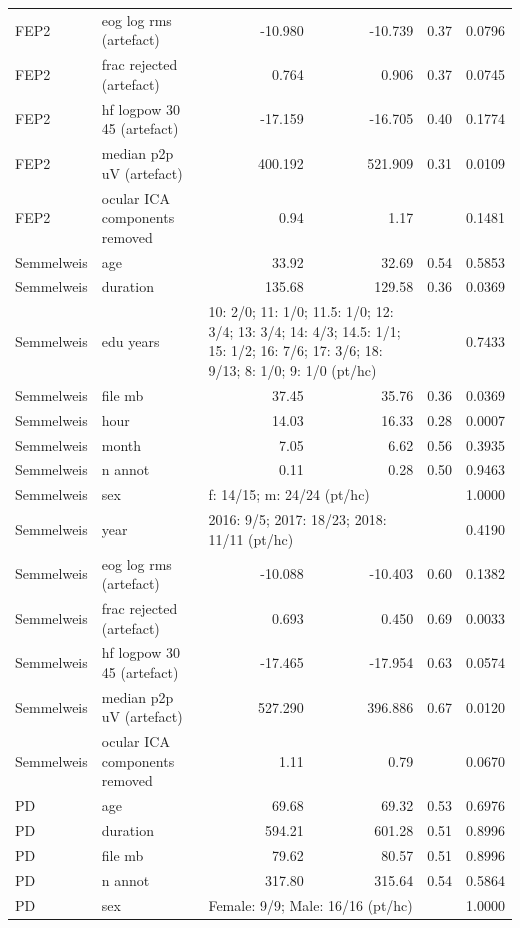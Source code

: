 \documentclass[10pt]{article}
\begin{document}
\begin{longtable}{l l r r r r}
FEP2 & eog log rms (artefact) & -10.980 & -10.739 & 0.37 & 0.0796 \\
FEP2 & frac rejected (artefact) & 0.764 & 0.906 & 0.37 & 0.0745 \\
FEP2 & hf logpow 30 45 (artefact) & -17.159 & -16.705 & 0.40 & 0.1774 \\
FEP2 & median p2p uV (artefact) & 400.192 & 521.909 & 0.31 & 0.0109 \\
FEP2 & ocular ICA components removed & 0.94 & 1.17 & & 0.1481 \\
\midrule
Semmelweis & age & 33.92 & 32.69 & 0.54 & 0.5853 \\
Semmelweis & duration & 135.68 & 129.58 & 0.36 & 0.0369 \\
Semmelweis & edu years & \multicolumn{2}{l}{10: 2/0; 11: 1/0; 11.5: 1/0; 12: 3/4; 13: 3/4; 14: 4/3; 14.5: 1/1; 15: 1/2; 16: 7/6; 17: 3/6; 18: 9/13; 8: 1/0; 9: 1/0 (pt/hc)} & & 0.7433 \\
Semmelweis & file mb & 37.45 & 35.76 & 0.36 & 0.0369 \\
Semmelweis & hour & 14.03 & 16.33 & 0.28 & 0.0007 \\
Semmelweis & month & 7.05 & 6.62 & 0.56 & 0.3935 \\
Semmelweis & n annot & 0.11 & 0.28 & 0.50 & 0.9463 \\
Semmelweis & sex & \multicolumn{2}{l}{f: 14/15; m: 24/24 (pt/hc)} & & 1.0000 \\
Semmelweis & year & \multicolumn{2}{l}{2016: 9/5; 2017: 18/23; 2018: 11/11 (pt/hc)} & & 0.4190 \\
Semmelweis & eog log rms (artefact) & -10.088 & -10.403 & 0.60 & 0.1382 \\
Semmelweis & frac rejected (artefact) & 0.693 & 0.450 & 0.69 & 0.0033 \\
Semmelweis & hf logpow 30 45 (artefact) & -17.465 & -17.954 & 0.63 & 0.0574 \\
Semmelweis & median p2p uV (artefact) & 527.290 & 396.886 & 0.67 & 0.0120 \\
Semmelweis & ocular ICA components removed & 1.11 & 0.79 & & 0.0670 \\
\midrule
PD & age & 69.68 & 69.32 & 0.53 & 0.6976 \\
PD & duration & 594.21 & 601.28 & 0.51 & 0.8996 \\
PD & file mb & 79.62 & 80.57 & 0.51 & 0.8996 \\
PD & n annot & 317.80 & 315.64 & 0.54 & 0.5864 \\
PD & sex & \multicolumn{2}{l}{Female: 9/9; Male: 16/16 (pt/hc)} & & 1.0000 \\

\end{longtable}
\end{document}

